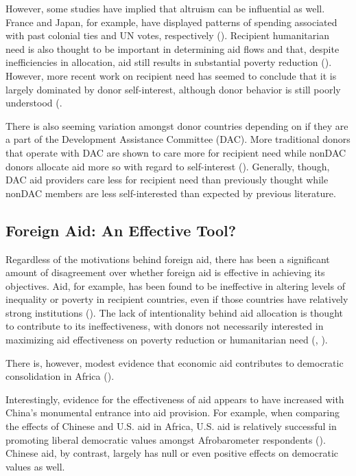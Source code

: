 \documentclass{article}
\begin{document}
However, some studies have implied that altruism can be influential as well. France and Japan, for example, have displayed patterns of spending associated with past colonial ties and UN votes, respectively (\cite{alesina2000}). Recipient humanitarian need is also thought to be important in determining aid flows and that, despite inefficiencies in allocation, aid still results in substantial poverty reduction (\cite{collier2002}). However, more recent work on recipient need has seemed to conclude that it is largely dominated by donor self-interest, although donor behavior is still poorly understood (\cite{hoeffler2011}.

There is also seeming variation amongst donor countries depending on if they are a part of the Development Assistance Committee (DAC). More traditional donors that operate with DAC are shown to care more for recipient need while nonDAC donors allocate aid more so with regard to self-interest (\cite{dreher2011}). Generally, though, DAC aid providers care less for recipient need than previously thought while nonDAC members are less self-interested than expected by previous literature.

\subsection*{Foreign Aid: An Effective Tool?}
Regardless of the motivations behind foreign aid, there has been a significant amount of disagreement over whether foreign aid is effective in achieving its objectives. Aid, for example, has been found to be ineffective in altering levels of inequality or poverty in recipient countries, even if those countries have relatively strong institutions (\cite{chong2009a}). The lack of intentionality behind aid allocation is thought to contribute to its ineffectiveness, with donors not necessarily interested in maximizing aid effectiveness on poverty reduction or humanitarian need (\cite{alesina2000}, \cite{collier2002}).

There is, however, modest evidence that economic aid contributes to democratic consolidation in Africa (\cite{dietrich2015a}).

Interestingly, evidence for the effectiveness of aid appears to have increased with China's monumental entrance into aid provision. For example, when comparing the effects of Chinese and U.S. aid in Africa, U.S. aid is relatively successful in promoting liberal democratic values amongst Afrobarometer respondents (\cite{blair2022}). Chinese aid, by contrast, largely has null or even positive effects on democratic values as well.
\end{document}
